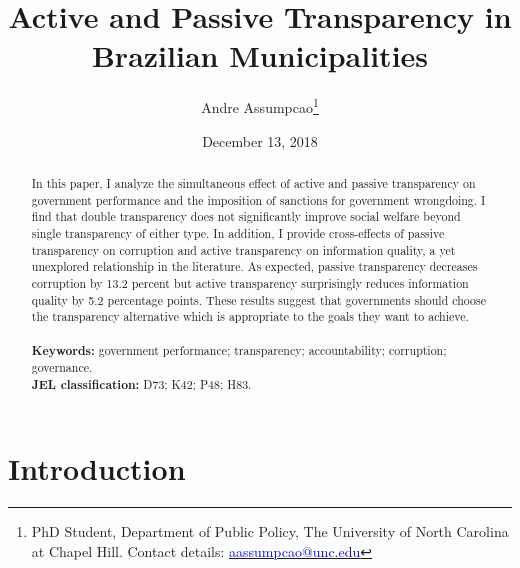 \documentclass[11pt]{article}
\begin{document}
\begin{titlepage}
\title{Active and Passive Transparency in Brazilian Municipalities}
\author{Andre Assumpcao\thanks{PhD Student, Department of Public Policy, The University of North Carolina at Chapel Hill. Contact details: \href{mailto:aassumpcao@unc.edu}{\textcolor{blue}{aassumpcao@unc.edu}}}}
\date{December 13, 2018}

\maketitle

\begin{abstract}
\noindent In this paper, I analyze the simultaneous effect of active and passive transparency on government performance and the imposition of sanctions for government wrongdoing. I find that double transparency does not significantly improve social welfare beyond single transparency of either type. In addition, I provide cross-effects of passive transparency on corruption and active transparency on information quality, a yet unexplored relationship in the literature. As expected, passive transparency decreases corruption by 13.2 percent but active transparency surprisingly reduces information quality by 5.2 percentage points. These results suggest that governments should choose the transparency alternative which is appropriate to the goals they want to achieve. \\
\vspace{0in} \\
\noindent\textbf{Keywords:} government performance; transparency; accountability; corruption; governance. \\

\noindent\textbf{JEL classification:} D73; K42; P48; H83. \\

\vspace{0in}
\bigskip

\end{abstract}

\setcounter{page}{0}

\thispagestyle{empty}

\end{titlepage}

\clearpage

\section{Introduction} \label{sec:introduction_paper3}
\end{document}
